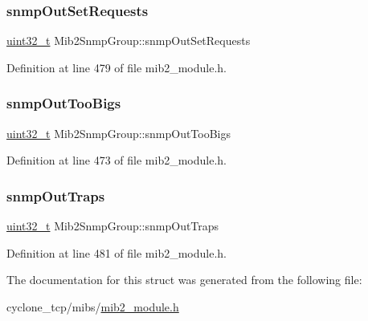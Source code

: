 \mbox{\label{structMib2SnmpGroup_a85420591eb733e88cbb166df148109fd}} 
\subsubsection{\texorpdfstring{snmp\+Out\+Set\+Requests}{snmpOutSetRequests}}
{\footnotesize\ttfamily \hyperlink{stdint_8h_a435d1572bf3f880d55459d9805097f62}{uint32\+\_\+t} Mib2\+Snmp\+Group\+::snmp\+Out\+Set\+Requests}



Definition at line 479 of file mib2\+\_\+module.\+h.

\mbox{\label{structMib2SnmpGroup_a001abf768f1c94da881559f73cec136d}} 
\subsubsection{\texorpdfstring{snmp\+Out\+Too\+Bigs}{snmpOutTooBigs}}
{\footnotesize\ttfamily \hyperlink{stdint_8h_a435d1572bf3f880d55459d9805097f62}{uint32\+\_\+t} Mib2\+Snmp\+Group\+::snmp\+Out\+Too\+Bigs}



Definition at line 473 of file mib2\+\_\+module.\+h.

\mbox{\label{structMib2SnmpGroup_ad44099b39ba4cae53deb6fff101beaf7}} 
\subsubsection{\texorpdfstring{snmp\+Out\+Traps}{snmpOutTraps}}
{\footnotesize\ttfamily \hyperlink{stdint_8h_a435d1572bf3f880d55459d9805097f62}{uint32\+\_\+t} Mib2\+Snmp\+Group\+::snmp\+Out\+Traps}



Definition at line 481 of file mib2\+\_\+module.\+h.



The documentation for this struct was generated from the following file\+:\begin{DoxyCompactItemize}
\item 
cyclone\+\_\+tcp/mibs/\hyperlink{mib2__module_8h}{mib2\+\_\+module.\+h}\end{DoxyCompactItemize}
